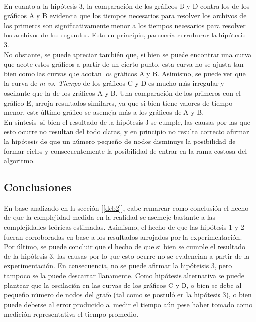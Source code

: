 \paragraph{}
En cuanto a la hipótesis 3, la comparación de los gráficos B y D contra los de los gráficos A y B evidencia que los tiempos necesarios para resolver los archivos de los primeros son significativamente menor a los tiempos necesarios para resolver los archivos de los segundos. Esto en principio, parecería corroborar la hipótesis 3.\\
No obstante, se puede apreciar también que, si bien se puede encontrar una curva que acote estos gráficos a partir de un cierto punto, esta curva no se ajusta tan bien como las curvas que acotan los gráficos A y B. Asímismo, se puede ver que la curva de \textit{m vs. Tiempo} de los gráficos C y D es mucho más irregular y oscilante que la de los gráficos A y B. Una comparación de los primeros con el gráfico E, arroja resultados similares, ya que si bien tiene valores de tiempo menor, este último gráfico se asemeja más a los gráficos de A y B.\\
En síntesis, si bien el resultado de la hipótesis 3 se cumple, las causas por las que esto ocurre no resultan del todo claras, y en principio no resulta correcto afirmar la hipótesis de que un número pequeño de nodos disminuye la posibilidad de formar ciclos y consecuentemente la posibilidad de entrar en la rama costosa del algoritmo.


\subsection{Conclusiones}
\label{conc2}
En base analizado en la sección [\ref{deb2}], cabe remarcar como conclusión el hecho de que la complejidad medida en la realidad se asemeje bastante a las complejidades teóricas estimadas. Asímismo, el hecho de que las hipótesis 1 y 2 fueran corroboradas en base a los resultados arrojados por la experimentación. \\ 
Por último, se puede concluir que el hecho de que si bien se cumple el resultado de la hipótesis 3, las causas por lo que esto ocurre no se evidencian a partir de la experimentación. En consecuencia, no se puede afirmar la hipóteisis 3, pero tampoco se la puede descartar llanamente. Como hipótesis alternativa se puede plantear que la oscilación en las curvas de los gráficos  C y D, o bien se debe al pequeño número de nodos del grafo (tal como se postuló en la hipótesis 3), o bien puede deberse al error producido al medir el tiempo aún pese haber tomado como medición representativa el tiempo promedio.


